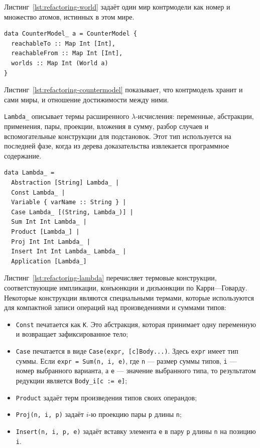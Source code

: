 \documentclass[14pt, russian]{scrartcl}
\begin{document}
Листинг~\ref{lst:refactoring-world} задаёт один мир контрмодели как номер и
множество атомов, истинных в этом мире.

\begin{listing}[!htb]
\caption{Контрмодель Крипке \texttt{CounterModel\_}}
\label{lst:refactoring-countermodel}
\begin{verbatim}
data CounterModel_ a = CounterModel {
  reachableTo :: Map Int [Int],
  reachableFrom :: Map Int [Int],
  worlds :: Map Int (World a)
}
\end{verbatim}
\end{listing}

Листинг~\ref{lst:refactoring-countermodel} показывает, что контрмодель хранит
и сами миры, и отношение достижимости между ними.

\texttt{Lambda\_} описывает термы расширенного $\lambda$-исчисления:
переменные, абстракции, применения, пары, проекции, вложения в сумму, разбор
случаев и вспомогательные конструкции для подстановок. Этот тип используется
на последней фазе, когда из дерева доказательства извлекается программное
содержание.

\begin{listing}[!htb]
\caption{Термы расширенного $\lambda$-исчисления}
\label{lst:refactoring-lambda}
\begin{verbatim}
data Lambda_ =
  Abstraction [String] Lambda_ |
  Const Lambda_ |
  Variable { varName :: String } |
  Case Lambda_ [(String, Lambda_)] |
  Sum Int Int Lambda_ |
  Product [Lambda_] |
  Proj Int Int Lambda_ |
  Insert Int Int Lambda_ Lambda_ |
  Application [Lambda_]
\end{verbatim}
\end{listing}

Листинг~\ref{lst:refactoring-lambda} перечисляет термовые конструкции,
соответствующие импликации, конъюнкции и дизъюнкции по Карри---Говарду.
Некоторые конструкции являются специальными термами, которые используются для
компактной записи операций над произведениями и суммами типов:
\begin{itemize}
\item \texttt{Const} печатается как \texttt{K}. Это абстракция, которая
  принимает одну переменную и возвращает зафиксированное тело;
\item \texttt{Case} печатается в виде
  \texttt{Case(expr, [c]Body...)}. Здесь \texttt{expr} имеет тип суммы. Если
  \texttt{expr = Sum(n, i, e)}, где \texttt{n} --- размер суммы типов,
  \texttt{i} --- номер выбранного варианта, а \texttt{e} --- значение выбранного
  типа, то результатом редукции является \texttt{Body\_i[c := e]};
\item \texttt{Product} задаёт терм произведения типов своих операндов;
\item \texttt{Proj(n, i, p)} задаёт $i$-ю проекцию пары \texttt{p} длины
  \texttt{n};
\item \texttt{Insert(n, i, p, e)} задаёт вставку элемента \texttt{e} в пару
  \texttt{p} длины \texttt{n} на позицию \texttt{i}.
\end{itemize}
\end{document}
